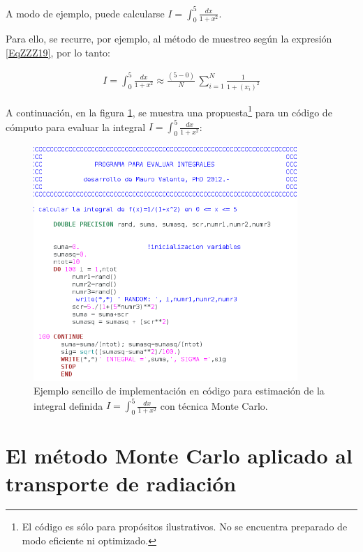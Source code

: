 A modo de ejemplo, puede calcularse $ I = \int _{0} ^{5} \frac{dx}{1 + x^{2}}$.
%

Para ello, se recurre, por ejemplo, al m\'etodo de muestreo seg\'un la expresi\'on \ref{EqZZZ19}, por lo tanto:

\begin{eqnarray}
 	I = \int _{0} ^{5} \frac{dx}{1 + x^{2}} \approx \frac{(5 - 0)}{N} \, \sum _{i=1} ^{N} \frac{1}{ 1 + (x_{i})^{2}}
 \label{EqZZZ21}
\end{eqnarray}

A continuaci\'on, en la figura \ref{Fig7_2}, se muestra una propuesta\footnote{El c\'odigo es s\'olo para prop\'ositos ilustrativos. No se encuentra preparado de modo
eficiente ni optimizado.} para un c\'odigo de c\'omputo para evaluar la integral $ I = \int _{0} ^{5} \frac{dx}{1 + x^{2}}$:


\begin{center}
\begin{figure} [!h]

\centering
\includegraphics[width=10cm]{figures/Fig7_2.png}

\caption{Ejemplo sencillo de implementaci\'on en c\'odigo para estimaci\'on de la integral definida $ I = \int _{0} ^{5} \frac{dx}{1 + x^{2}}$
con t\'ecnica Monte Carlo.}
\label{Fig7_2}

\end{figure}
\end{center}

\section{El m\'etodo Monte Carlo aplicado al transporte de radiaci\'on}
\label{CapVII_9}

